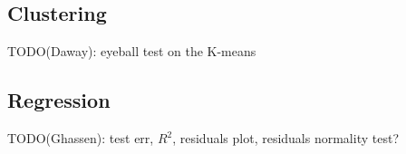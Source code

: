 
\subsection{Clustering}

TODO(Daway): eyeball test on the K-means

\subsection{Regression}

TODO(Ghassen): test err, $R^2$, residuals plot, residuals normality test?